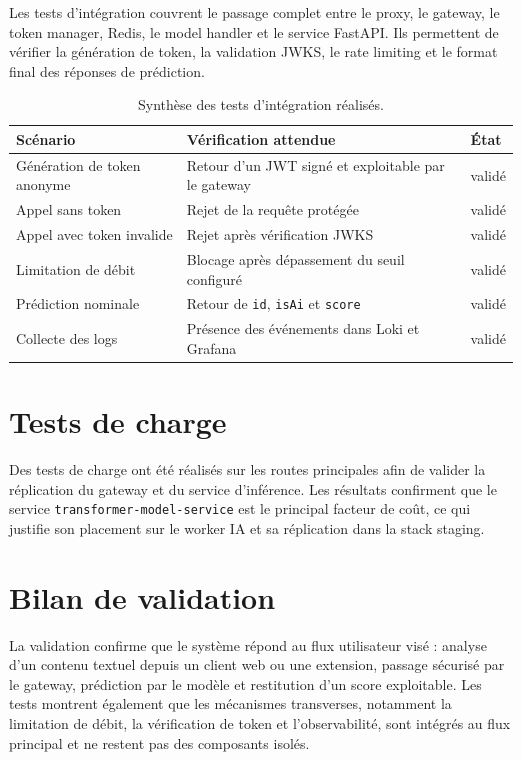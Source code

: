﻿\documentclass[12pt, a4paper]{report}
\begin{document}
Les tests d'intégration couvrent le passage complet entre le proxy, le gateway,
le token manager, Redis, le model handler et le service FastAPI. Ils permettent
de vérifier la génération de token, la validation JWKS, le rate limiting et le
format final des réponses de prédiction.

\begin{table}[H]
\centering
\renewcommand{\arraystretch}{1.35}
\begin{tabular}{p{}p{}p{}}
\toprule
\textbf{Scénario} & \textbf{Vérification attendue} & \textbf{État} \\
\midrule
Génération de token anonyme & Retour d'un JWT signé et exploitable par le gateway & validé \\
Appel sans token & Rejet de la requête protégée & validé \\
Appel avec token invalide & Rejet après vérification JWKS & validé \\
Limitation de débit & Blocage après dépassement du seuil configuré & validé \\
Prédiction nominale & Retour de \texttt{id}, \texttt{isAi} et \texttt{score} & validé \\
Collecte des logs & Présence des événements dans Loki et Grafana & validé \\
\bottomrule
\end{tabular}
\caption{Synthèse des tests d'intégration réalisés.}
\label{tab:tests-integration}
\end{table}

\section{Tests de charge}

Des tests de charge ont été réalisés sur les routes principales afin de valider
la réplication du gateway et du service d'inférence. Les résultats confirment que
le service \texttt{transformer-model-service} est le principal facteur de coût,
ce qui justifie son placement sur le worker IA et sa réplication dans la stack
staging.

\section{Bilan de validation}

La validation confirme que le système répond au flux utilisateur visé : analyse
d'un contenu textuel depuis un client web ou une extension, passage sécurisé par
le gateway, prédiction par le modèle et restitution d'un score exploitable. Les
tests montrent également que les mécanismes transverses, notamment la limitation
de débit, la vérification de token et l'observabilité, sont intégrés au flux
principal et ne restent pas des composants isolés.
\end{document}
